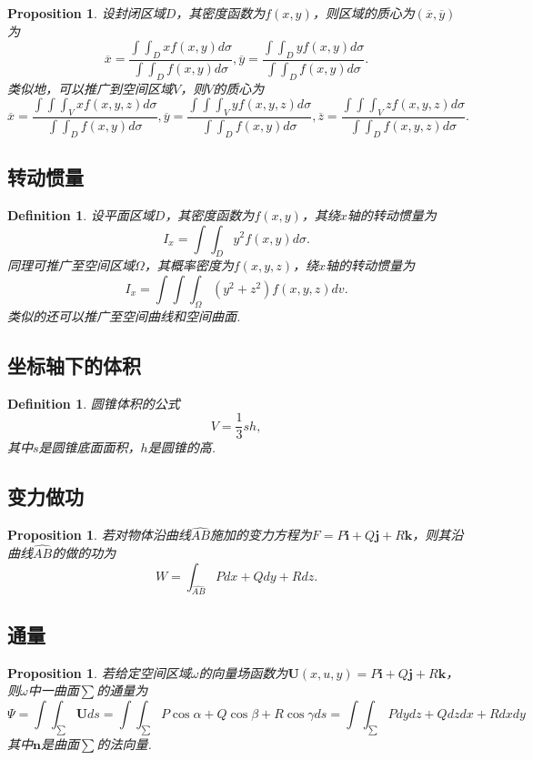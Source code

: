 \documentclass{article}
\newcommand{\mbf}[1]{\bm{#1}}
\newtheorem{proposition}[theorem]{Proposition}
\newtheorem{definition}[theorem]{Definition}
\begin{document}
\begin{proposition}
\rm 设封闭区域$D$，其密度函数为$f(x,y)$，则区域的质心为$(\overline{x},\overline{y})$为
$$
\overline{x} = \frac{\int\int_D xf(x,y)d\sigma}{\int\int_D f(x,y)d\sigma}, \overline{y} = \frac{\int\int_D yf(x,y)d\sigma}{\int\int_D f(x,y)d\sigma}.
$$
类似地，可以推广到空间区域$V$，则$V$的质心为
$$
\overline{x} = \frac{\int\int\int_V xf(x,y,z)d\sigma}{\int\int_D f(x,y)d\sigma}, 
\overline{y} = \frac{\int\int\int_V yf(x,y,z)d\sigma}{\int\int_D f(x,y)d\sigma},
\overline{z} = \frac{\int\int\int_V zf(x,y,z)d\sigma}{\int\int_D f(x,y,z)d\sigma}.
$$
\end{proposition}

\subsection{转动惯量}

\begin{definition}
\rm 设平面区域$D$，其密度函数为$f(x,y)$，其绕$x$轴的转动惯量为
$$
I_x = \int\int_D y^2 f(x,y)d\sigma.
$$
同理可推广至空间区域$\Omega$，其概率密度为$f(x,y,z)$，绕$x$轴的转动惯量为
$$
I_x = \int\int\int_\Omega (y^2+z^2) f(x,y,z)dv.
$$
类似的还可以推广至空间曲线和空间曲面. 
\end{definition}

\subsection{坐标轴下的体积}

\begin{definition}
\rm 圆锥体积的公式
$$
V = \frac{1}{3}sh,
$$
其中$s$是圆锥底面面积，$h$是圆锥的高. 
\end{definition}

\subsection{变力做功}

\begin{proposition}
\rm 若对物体沿曲线$\widehat{AB}$施加的变力方程为$F = P\mbf{i}+Q\mbf{j}+R\mbf{k}$，则其沿曲线$\widehat{AB}$的做的功为
$$
W = \int_{\widehat{AB}}  Pdx+Qdy+Rdz. 
$$
\end{proposition}

\subsection{通量}

\begin{proposition}
\rm 若给定空间区域$\omega$的向量场函数为$\mbf{U}(x,u,y)=P\mbf{i}+Q\mbf{j}+R\mbf{k}$，则$\omega$中一曲面$\sum$的通量为
$$
\Psi = \int\int_\sum \mbf{U} ds= \int\int_\sum P\cos\alpha+Q\cos\beta+R\cos\gamma ds  = \int\int_\sum Pdydz + Qdzdx + Rdxdy
$$
其中$\mbf{n}$是曲面$\sum$的法向量. 
\end{proposition}
\end{document}
